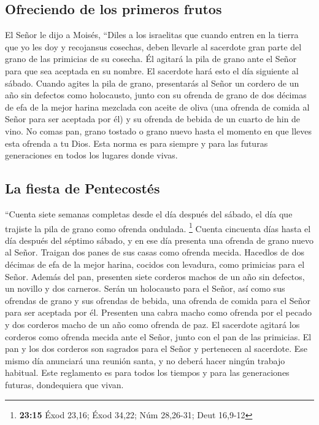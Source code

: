 \hypertarget{ofreciendo-de-los-primeros-frutos}{%
\subsection{Ofreciendo de los primeros
frutos}\label{ofreciendo-de-los-primeros-frutos}}

 El Señor le dijo a Moisés,  ``Diles a los
israelitas que cuando entren en la tierra que yo les doy y recojansus
cosechas, deben llevarle al sacerdote gran parte del grano de las
primicias de su cosecha.  Él agitará la pila de grano
ante el Señor para que sea aceptada en su nombre. El sacerdote hará esto
el día siguiente al sábado.  Cuando agites la pila de
grano, presentarás al Señor un cordero de un año sin defectos como
holocausto,  junto con su ofrenda de grano de dos décimas
de efa de la mejor harina mezclada con aceite de oliva (una ofrenda de
comida al Señor para ser aceptada por él) y su ofrenda de bebida de un
cuarto de hin de vino.  No comas pan, grano tostado o
grano nuevo hasta el momento en que lleves esta ofrenda a tu Dios. Esta
norma es para siempre y para las futuras generaciones en todos los
lugares donde vivas.

\hypertarget{la-fiesta-de-pentecostuxe9s}{%
\subsection{La fiesta de
Pentecostés}\label{la-fiesta-de-pentecostuxe9s}}

 ``Cuenta siete semanas completas desde el día después
del sábado, el día que trajiste la pila de grano como ofrenda ondulada.
\footnote{\textbf{23:15} Éxod 23,16; Éxod 34,22; Núm 28,26-31; Deut
  16,9-12}  Cuenta cincuenta días hasta el día después
del séptimo sábado, y en ese día presenta una ofrenda de grano nuevo al
Señor.  Traigan dos panes de sus casas como ofrenda
mecida. Hacedlos de dos décimas de efa de la mejor harina, cocidos con
levadura, como primicias para el Señor.  Además del pan,
presenten siete corderos machos de un año sin defectos, un novillo y dos
carneros. Serán un holocausto para el Señor, así como sus ofrendas de
grano y sus ofrendas de bebida, una ofrenda de comida para el Señor para
ser aceptada por él.  Presenten una cabra macho como
ofrenda por el pecado y dos corderos macho de un año como ofrenda de
paz.  El sacerdote agitará los corderos como ofrenda
mecida ante el Señor, junto con el pan de las primicias. El pan y los
dos corderos son sagrados para el Señor y pertenecen al sacerdote.
 Ese mismo día anunciará una reunión santa, y no deberá
hacer ningún trabajo habitual. Este reglamento es para todos los tiempos
y para las generaciones futuras, dondequiera que vivan.

